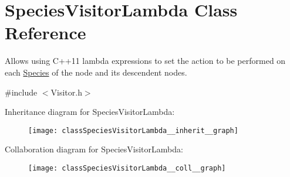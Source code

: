 \hypertarget{classSpeciesVisitorLambda}{\section{Species\+Visitor\+Lambda Class Reference}
\label{classSpeciesVisitorLambda}
}


Allows using C++11 lambda expressions to set the action to be performed on each \hyperlink{classSpecies}{Species} of the node and its descendent nodes.  




{\ttfamily \#include $<$Visitor.\+h$>$}



Inheritance diagram for Species\+Visitor\+Lambda\+:\nopagebreak
\begin{figure}[H]
\begin{center}
\leavevmode
\texttt{[image: classSpeciesVisitorLambda\_\_inherit\_\_graph]}
\end{center}
\end{figure}


Collaboration diagram for Species\+Visitor\+Lambda\+:\nopagebreak
\begin{figure}[H]
\begin{center}
\leavevmode
\texttt{[image: classSpeciesVisitorLambda\_\_coll\_\_graph]}
\end{center}
\end{figure}
